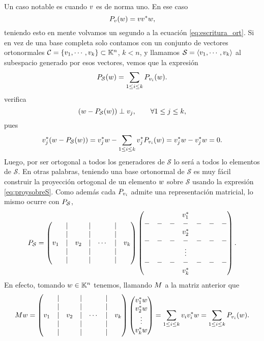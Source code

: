 Un caso notable es cuando $\vb$ es de norma uno. En ese caso
\begin{equation}
 \label{eq:proy_forma2_norma1}
 \Pb_{\vb}(\wb)=\vb\vb^*\wb,
\end{equation}
teniendo esto en mente volvamos un segundo a la ecuación \eqref{eq:escritura_ort}. Si en vez de una base completa solo contamos con un conjunto de vectores ortonormales $\mathcal{C}=\{\vb_1,\cdots,\vb_k\}\subset \Kn$, $k<n$, y llamamos $\mathcal{S}=\langle \vb_1,\cdots,\vb_k\rangle$ al subespacio generado por esos vectores, vemos  que la expresión
\begin{equation}
 \label{eq:proysobreS}
\Pb_{\mathcal{S}}(\wb)=\sum_{1\le i\le k}\Pb_{\vb_i}(\wb).
\end{equation}
verifica
$$
(\wb-\Pb_{\mathcal{S}}(\wb))\perp \vb_j, \qquad \forall 1\le j\le k,
$$
pues
$$
\vb_j^*(\wb-\Pb_{\mathcal{S}}(\wb))=\vb_j^*\wb -\sum_{1\le i\le k}\vb_j^*\Pb_{\vb_i}(\wb)= \vb_j^*\wb-\vb_j^*\wb=0.
$$
Luego, por ser ortogonal a todos los generadores de $\mathcal{S}$ lo será a todos lo elementos de $\mathcal{S}$. En otras palabras, teniendo una base ortonormal de $\mathcal{S}$ es muy fácil construir la proyección ortogonal de un elemento $\wb$ sobre  $\mathcal{S}$ usando la expresión \eqref{eq:proysobreS}.
Como además cada $\Pb_{\vb_i}$ admite una representación matricial, lo mismo ocurre con  $\Pb_{\mathcal{S}}$,
$$\Pb_{\mathcal{S}}=
\begin{pmatrix}
&|&&|&&|&\\
&|&&|&&|&\\
\vb_1&|&\vb_2&|&\cdots&|&\vb_k\\
&|&&|&&|&\\
&|&&|&&|&\\
\end{pmatrix}
\begin{pmatrix}
&&&\vb_1^*&&&\\
-&-&-&-&-&-&-\\
&&&\vb_2^*&&&\\
-&-&-&-&-&-&-\\
 &&&\vdots&&& \\
-&-&-&-&-&-&-\\
&&&\vb_k^*&&&
\end{pmatrix}.
$$
En efecto, tomando $w\in \mathbb K^n$ tenemos, llamando $\Mb$ a la matriz anterior que
$$
\Mb\wb=\begin{pmatrix}
&|&&|&&|&\\
&|&&|&&|&\\
\vb_1&|&\vb_2&|&\cdots&|&\vb_k\\
&|&&|&&|&\\
&|&&|&&|&\\
\end{pmatrix}
\begin{pmatrix}
 \vb_1^*\wb\\
 \vb_2^*\wb\\
 \vdots \\
 \vb_k^*\wb\\
 \end{pmatrix}
=\sum_{1\le i\le k}\vb_i\vb_i^*\wb
=\sum_{1\le i\le k}\Pb_{\vb_i}(\wb).
$$
